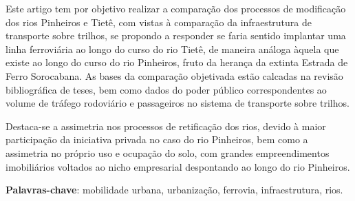 \documentclass[
article,			%
11pt,				%
oneside,			%
a4paper,			%
english,			%
brazil,				%
sumario=tradicional
]{abntex2}
\begin{document}
	
	
	\frenchspacing 
	
	
	\maketitle
	
	\begin{resumoumacoluna}

		Este artigo tem por objetivo realizar a comparação dos processos de modificação dos rios Pinheiros e Tietê, com vistas à comparação da infraestrutura de transporte sobre trilhos, se propondo a responder se faria sentido implantar uma linha ferroviária ao longo do curso do rio Tietê, de maneira análoga àquela que existe ao longo do curso do rio Pinheiros, fruto da herança da extinta Estrada de Ferro Sorocabana. As bases da comparação objetivada estão calcadas na revisão bibliográfica de teses, bem como dados do poder público correspondentes ao volume de tráfego rodoviário e passageiros no sistema de transporte sobre trilhos.
	
		Destaca-se a assimetria nos processos de retificação dos rios, devido à maior participação da iniciativa privada no caso do rio Pinheiros, bem como a assimetria no próprio uso e ocupação do solo, com grandes empreendimentos imobiliários voltados ao nicho empresarial despontando ao longo do rio Pinheiros.
		
		\vspace{\onelineskip}
		
		\noindent
		\textbf{Palavras-chave}: mobilidade urbana, urbanização, ferrovia, infraestrutura, rios.
	\end{resumoumacoluna}
	
\end{document}

